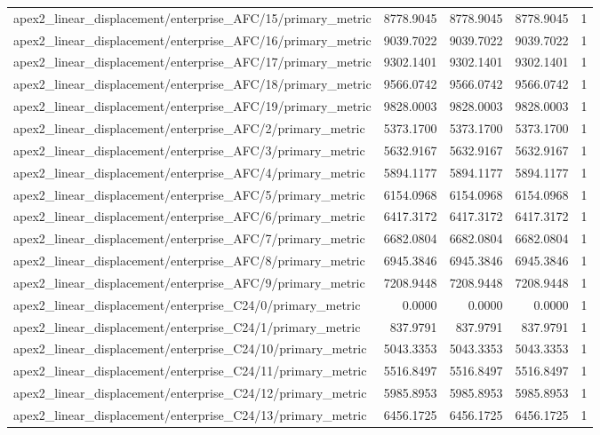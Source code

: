 \begin{table}[h]
\begin{tabular}{lrrrr}
apex2_linear_displacement/enterprise_AFC/15/primary_metric & 8778.9045 & 8778.9045 & 8778.9045 & 1 \\
apex2_linear_displacement/enterprise_AFC/16/primary_metric & 9039.7022 & 9039.7022 & 9039.7022 & 1 \\
apex2_linear_displacement/enterprise_AFC/17/primary_metric & 9302.1401 & 9302.1401 & 9302.1401 & 1 \\
apex2_linear_displacement/enterprise_AFC/18/primary_metric & 9566.0742 & 9566.0742 & 9566.0742 & 1 \\
apex2_linear_displacement/enterprise_AFC/19/primary_metric & 9828.0003 & 9828.0003 & 9828.0003 & 1 \\
apex2_linear_displacement/enterprise_AFC/2/primary_metric & 5373.1700 & 5373.1700 & 5373.1700 & 1 \\
apex2_linear_displacement/enterprise_AFC/3/primary_metric & 5632.9167 & 5632.9167 & 5632.9167 & 1 \\
apex2_linear_displacement/enterprise_AFC/4/primary_metric & 5894.1177 & 5894.1177 & 5894.1177 & 1 \\
apex2_linear_displacement/enterprise_AFC/5/primary_metric & 6154.0968 & 6154.0968 & 6154.0968 & 1 \\
apex2_linear_displacement/enterprise_AFC/6/primary_metric & 6417.3172 & 6417.3172 & 6417.3172 & 1 \\
apex2_linear_displacement/enterprise_AFC/7/primary_metric & 6682.0804 & 6682.0804 & 6682.0804 & 1 \\
apex2_linear_displacement/enterprise_AFC/8/primary_metric & 6945.3846 & 6945.3846 & 6945.3846 & 1 \\
apex2_linear_displacement/enterprise_AFC/9/primary_metric & 7208.9448 & 7208.9448 & 7208.9448 & 1 \\
apex2_linear_displacement/enterprise_C24/0/primary_metric & 0.0000 & 0.0000 & 0.0000 & 1 \\
apex2_linear_displacement/enterprise_C24/1/primary_metric & 837.9791 & 837.9791 & 837.9791 & 1 \\
apex2_linear_displacement/enterprise_C24/10/primary_metric & 5043.3353 & 5043.3353 & 5043.3353 & 1 \\
apex2_linear_displacement/enterprise_C24/11/primary_metric & 5516.8497 & 5516.8497 & 5516.8497 & 1 \\
apex2_linear_displacement/enterprise_C24/12/primary_metric & 5985.8953 & 5985.8953 & 5985.8953 & 1 \\
apex2_linear_displacement/enterprise_C24/13/primary_metric & 6456.1725 & 6456.1725 & 6456.1725 & 1 \\

\end{tabular}
\end{table}
